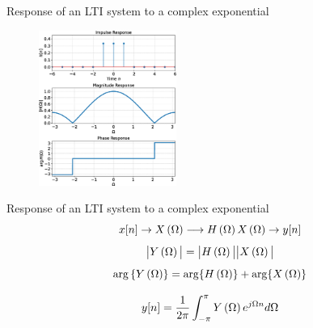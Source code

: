 \documentclass[aspectratio=169]{beamer}
\def\lp{\ensuremath\left(}
\def\rp{\ensuremath\right)}
\begin{document}
\begin{frame}[t]{Response of an LTI system to a complex exponential}
  \begin{center}
  \begin{figure}
  \centering
  \includegraphics[width=0.4\textwidth]{img/movavg.eps}
  \end{figure}
  \end{center}
\end{frame}


\begin{frame}[t]{Response of an LTI system to a complex exponential}
\[ x[n] \rightarrow X\lp \Omega \rp \longrightarrow H\lp \Omega \rp X\lp \Omega \rp \rightarrow y[n]\]
\[ \big \vert Y\lp \Omega \rp \big \vert = \big \vert H\lp \Omega \rp\big \vert \big \vert X\lp \Omega \rp\big \vert \]
\[ \arg  \, \{ Y\lp \Omega \rp \} = \arg \{ H\lp \Omega \rp \} + \arg \{ X\lp \Omega \rp \} \]

\[ y[n] = \frac{1}{2\pi} \int_{-\pi}^{\pi} Y\lp \Omega \rp e^{j\Omega n} d\Omega \]
\end{frame}


\end{document}
